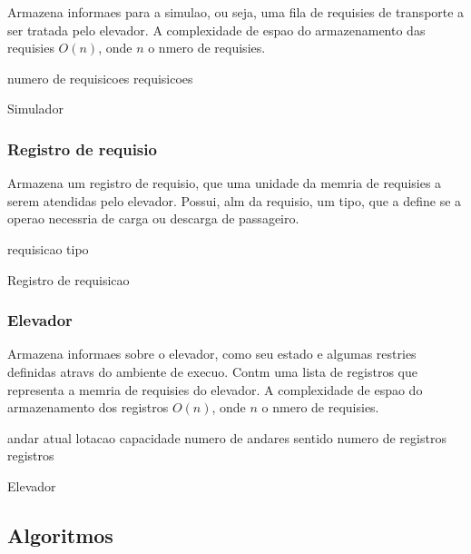 \documentclass[12pt]{article}
\begin{document}
Armazena informaes para a simulao, ou seja, uma fila de requisies de transporte a ser tratada pelo elevador. A complexidade de espao do armazenamento das requisies  $O(n)$, onde $n$  o nmero de requisies.
\begin{algorithm}[h!]
\begin{footnotesize}
	numero de requisicoes\;
	requisicoes\;

\caption{Simulador}%
\end{footnotesize}
\end{algorithm}

\subsubsection{Registro de requisio}

Armazena um registro de requisio, que  uma unidade da memria de requisies a serem atendidas pelo elevador. Possui, alm da requisio, um tipo, que a define se a operao necessria  de carga ou descarga de passageiro.
\begin{algorithm}[h!]
\begin{footnotesize}

	requisicao\;
	tipo\;

\caption{Registro de requisicao}%
\end{footnotesize}
\end{algorithm}


\subsubsection{Elevador}

Armazena informaes sobre o elevador, como seu estado e algumas restries definidas atravs do ambiente de execuo. Contm uma lista de registros que representa a memria de requisies do elevador. A complexidade de espao do armazenamento dos registros  $O(n)$, onde $n$  o nmero de requisies.
\begin{algorithm}[h!]
\begin{footnotesize}

	andar atual\;
	lotacao\;
	capacidade\;
	numero de andares\;
	sentido\;
	numero de registros\;
	registros\;

\caption{Elevador}%
\end{footnotesize}
\end{algorithm}


\subsection{Algoritmos}
\end{document}
